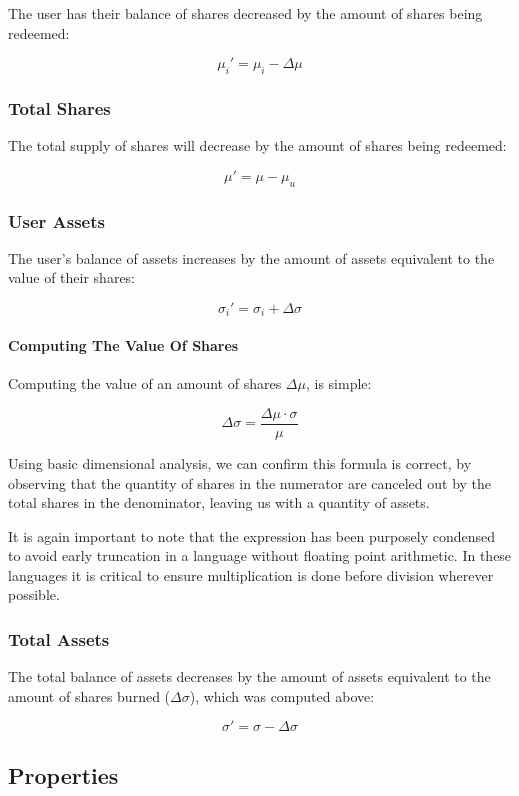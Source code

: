 \documentclass{article}
\begin{document}
The user has their balance of shares decreased by the amount of shares being redeemed:

$$ \mu_i' = \mu_i - \Delta\mu $$

\subsubsection{Total Shares}

The total supply of shares will decrease by the amount of shares being redeemed:

$$ \mu' = \mu - \mu_{u} $$

\subsubsection{User Assets}

The user's balance of assets increases by the amount of assets equivalent to the value of their shares:

$$ \sigma_i' = \sigma_i + \Delta\sigma $$

\paragraph{Computing The Value Of Shares}

Computing the value of an amount of shares $\Delta\mu$, is simple:

$$ \Delta\sigma = \frac{\Delta\mu \cdot \sigma}{\mu} $$

Using basic dimensional analysis, we can confirm this formula is correct, by observing that the quantity of shares in the numerator are canceled out by the total shares in the denominator, leaving us with a quantity of assets.

It is again important to note that the expression has been purposely condensed to avoid early truncation in a language without floating point arithmetic. In these languages it is critical to ensure multiplication is done before division wherever possible.

\subsubsection{Total Assets}

The total balance of assets decreases by the amount of assets equivalent to the amount of shares burned ($\Delta\sigma$), which was computed above:

$$ \sigma' = \sigma - \Delta\sigma $$

\subsection{Properties}
\end{document}
